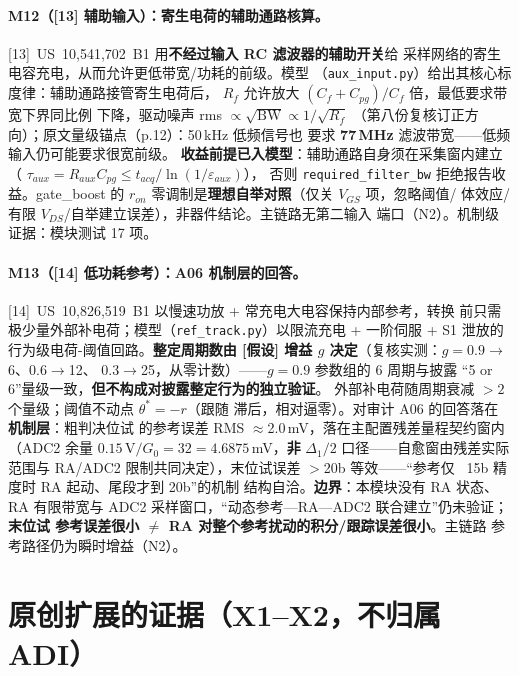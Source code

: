 \documentclass[11pt,a4paper,fontset=fandol]{ctexart}
\begin{document}
\paragraph{M12（[13] 辅助输入）：寄生电荷的辅助通路核算。}
[13]~US~10,541,702~B1 用\textbf{不经过输入 RC 滤波器的辅助开关}给
采样网络的寄生电容充电，从而允许更低带宽/功耗的前级。模型
（\texttt{aux\_input.py}）给出其核心标度律：辅助通路接管寄生电荷后，
$R_f$ 允许放大 $(C_f{+}C_{pg})/C_f$ 倍，最低要求带宽下界同比例
下降，驱动噪声 rms $\propto\sqrt{\mathrm{BW}}\propto 1/\sqrt{R_f}$
（第八份复核订正方向）；原文量级锚点（p.12）：50\,kHz 低频信号也
要求 \textbf{77\,MHz} 滤波带宽——低频输入仍可能要求很宽前级。
\textbf{收益前提已入模型}：辅助通路自身须在采集窗内建立（
$\tau_{aux}=R_{aux}C_{pg}\le t_{acq}/\ln(1/\varepsilon_{aux})$），
否则 \texttt{required\_filter\_bw} 拒绝报告收益。gate\_boost 的
$r_{on}$ 零调制是\textbf{理想自举对照}（仅关 $V_{GS}$ 项，忽略阈值/
体效应/有限 $V_{DS}$/自举建立误差），非器件结论。主链路无第二输入
端口（N2）。机制级证据：模块测试 17 项。

\paragraph{M13（[14] 低功耗参考）：A06 机制层的回答。}
[14]~US~10,826,519~B1 以慢速功放 + 常充电大电容保持内部参考，转换
前只需极少量外部补电荷；模型（\texttt{ref\_track.py}）以限流充电 +
一阶伺服 + S1 泄放的行为级电荷-阈值回路。\textbf{整定周期数由
[假设] 增益 $g$ 决定}（复核实测：$g{=}0.9\to$6、$0.6\to$12、
$0.3\to$25，从零计数）——$g{=}0.9$ 参数组的 6 周期与披露
``5 or 6''量级一致，\textbf{但不构成对披露整定行为的独立验证}。
外部补电荷随周期衰减 $>2$ 个量级；阈值不动点 $\theta^{*}=-r$（跟随
滞后，相对逼零）。对审计 A06 的回答落在\textbf{机制层}：粗判决位试
的参考误差 RMS $\approx$2.0\,mV，落在主配置残差量程契约窗内（ADC2
余量 $0.15$\,V$/G_0{=}32=4.6875$\,mV，\textbf{非} $\Delta_1/2$
口径——自愈窗由残差实际范围与 RA/ADC2 限制共同决定），末位试误差
$>$20b 等效——``参考仅 ~15b 精度时 RA 起动、尾段才到 20b''的机制
结构自洽。\textbf{边界}：本模块没有 RA 状态、RA 有限带宽与 ADC2
采样窗口，``动态参考—RA—ADC2 联合建立''仍未验证；\textbf{末位试
参考误差很小 $\neq$ RA 对整个参考扰动的积分/跟踪误差很小}。主链路
参考路径仍为瞬时增益（N2）。

\section{原创扩展的证据（X1--X2，不归属 ADI）}
\end{document}
